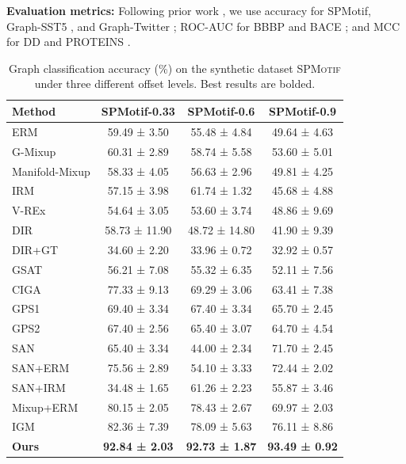 \documentclass[a4paper,fleqn]{cas-dc}
\begin{document}
\textbf{Evaluation metrics:} Following prior work \cite{jia2024graph}, we use accuracy for SPMotif, Graph-SST5 \cite{socher2013recursive}, and Graph-Twitter \cite{dong2014adaptive}; ROC-AUC for BBBP \cite{hu2020open} and BACE \cite{hu2020open}; and MCC for DD \cite{Morris+2020} and PROTEINS \cite{Morris+2020}.
\begin{table}%
\caption{Graph classification accuracy (\%) on the synthetic dataset \textsc{SPMotif} under three different offset levels. Best results are bolded.}
\label{tbl3}
\begin{tabular*}{\tblwidth}{@{}LCCC@{}}
\toprule
\textbf{Method} & \textbf{SPMotif-0.33} & \textbf{SPMotif-0.6} & \textbf{SPMotif-0.9} \\
\midrule
ERM\cite{donini2018empirical}            & 59.49 ± 3.50  & 55.48 ± 4.84  & 49.64 ± 4.63 \\
G-Mixup\cite{han2022g}        & 60.31 ± 2.89  & 58.74 ± 5.58  & 53.60 ± 5.01 \\
Manifold-Mixup\cite{verma2019manifold} & 58.33 ± 4.05  & 56.63 ± 2.96  & 49.81 ± 4.25 \\
IRM\cite{DBLP:journals/corr/abs-1907-02893}            & 57.15 ± 3.98  & 61.74 ± 1.32  & 45.68 ± 4.88 \\
V-REx\cite{krueger2021out}          & 54.64 ± 3.05  & 53.60 ± 3.74  & 48.86 ± 9.69 \\
DIR\cite{wu2022discovering}            & 58.73 ± 11.90 & 48.72 ± 14.80 & 41.90 ± 9.39 \\
{\color{blue}DIR+GT}           & 34.60 ± 2.20 & 33.96 ± 0.72 & 32.92 ± 0.57 \\
GSAT\cite{miao2022interpretable}           & 56.21 ± 7.08  & 55.32 ± 6.35  & 52.11 ± 7.56 \\
CIGA\cite{chen2023pareto}           & 77.33 ± 9.13  & 69.29 ± 3.06  & 63.41 ± 7.38 \\
{\color{blue}GPS1\cite{rampavsek2022recipe}}            & 69.40 ± 3.34  &  67.40 ± 3.34  &  65.70 ± 2.45  \\
{\color{blue}GPS2\cite{rampavsek2022recipe}}            &  67.40 ± 2.56  &  65.40 ± 3.07  &  64.70 ± 4.54  \\
{\color{blue}SAN\cite{kreuzer2021rethinking}}            & 65.40 ± 3.34 & 44.00 ± 2.34 & 71.70 ± 2.45 \\
{\color{blue}SAN+ERM}            & 75.56 ± 2.89 & 54.10 ± 3.33 & 72.44 ± 2.02 \\
{\color{blue}SAN+IRM}            & 34.48 ± 1.65 & 61.26 ± 2.23 & 55.87 ± 3.46 \\
{\color{blue}Mixup+ERM\cite{wang2021mixup}}             & 80.15 ± 2.05 & 78.43 ± 2.67 &  69.97 ± 2.03  \\
IGM\cite{jia2024graph}             & 82.36 ± 7.39  & 78.09 ± 5.63  & 76.11 ± 8.86 \\
\textbf{Ours}  & \textbf{92.84 ± 2.03} & \textbf{92.73 ± 1.87} & \textbf{93.49 ± 0.92} \\
\bottomrule
\end{tabular*}
\end{table}
\end{document}
